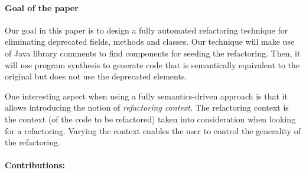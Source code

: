 \documentclass[runningheads,a4paper]{llncs}
\begin{document}

\paragraph{Goal of the paper} 
Our goal in this paper is to design a fully automated refactoring
technique for eliminating deprecated fields, methods and classes. Our
technique will make use of Java library comments to find components
for seeding the refactoring. Then, it will use program synthesis to
generate code that is semantically equivalent to the original but does not use
the deprecated elements.

One interesting aspect when using a fully semantics-driven approach is
that it allows introducing the notion of {\em refactoring context}.
The refactoring context is the context (of the code to be refactored)
taken into consideration when looking for a refactoring. Varying the
context enables the user to control the generality of the refactoring.
%
%


\paragraph{Contributions:}
\end{document}
